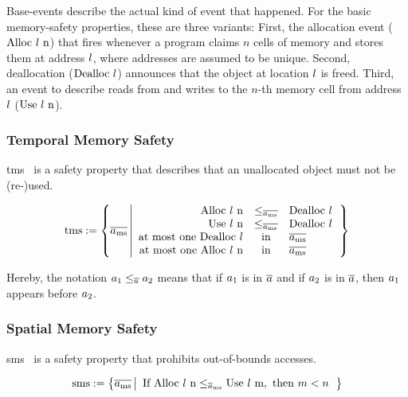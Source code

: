 Base-events describe the actual kind of event that happened.
For the basic memory-safety properties, these are three variants:
First, the allocation event ($\ev{Alloc\ \loc\ n}$) that fires whenever a program claims $n$ cells of memory and stores them at address $\loc$, where addresses are assumed to be unique.
Second, deallocation ($\ev{Dealloc\ \loc}$) announces that the object at location $\loc$ is freed.
Third, an event to describe reads from and writes to the $n$-th memory cell from address $\loc$ ($\ev{Use\ \loc\ n}$).

\subsubsection{Temporal Memory Safety}

\gls*{tms}~\cite{nagarakatte2010cets} is a safety property that describes that an unallocated object must not be (re-)used.

\begin{definition}\label{def:trace:tmsdef}
  $$
  \tmssafe:=\left\{\trace[_{\mssafe}] \left| \begin{array}{rcl}
    \ev{Alloc\ \loc\ n}&\le_{\trace[_{\mssafe}]}&\ev{Dealloc\ \loc} \\
    \ev{Use\ \loc\ n}&\le_{\trace[_{\mssafe}]}&\ev{Dealloc\ \loc} \\
    \text{at most one }\ev{Dealloc\ \loc}&\text{in}&\trace[_{\mssafe}] \\
    \text{at most one }\ev{Alloc\ \loc\ n}&\text{in}&\trace[_{\mssafe}] \\
  \end{array}\right.\right\}
  $$
\end{definition}
Hereby, the notation $\event[_{1}]\le_{\trace}\event[_{2}]$ means that if $\event[_{1}]$ is in $\trace$ and if $\event[_{2}]$ is in $\trace$, then $\event[_{1}]$ appears before $\event[_{2}]$.

\subsubsection{Spatial Memory Safety}

\gls*{sms}~\cite{nagarakatte2009soft} is a safety property that prohibits out-of-bounds accesses.

\begin{definition}\label{def:trace:smsdef}

  \noindent
  \[
  \smssafe:=\left\{\trace[_{\mssafe}] \left|\begin{array}{rcl}
      \text{If }\ev{Alloc\ \loc\ n}\le_{\trace_{\mssafe}}\ev{Use\ \loc\ m}, \text{ then }m<n
  \end{array}\right.\right\}
  \]
\end{definition}


